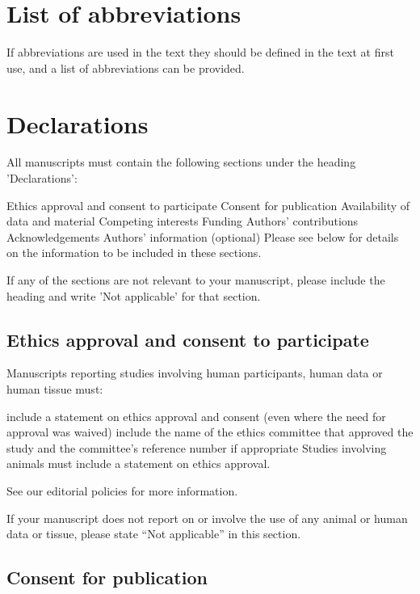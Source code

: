 \documentclass{bmcart}
\begin{document}
\begin{backmatter}



\section*{List of abbreviations}

If abbreviations are used in the text they should be defined in the text at first use, and a list of abbreviations can be provided.

\section*{Declarations}

All manuscripts must contain the following sections under the heading 'Declarations':

Ethics approval and consent to participate
Consent for publication
Availability of data and material
Competing interests
Funding
Authors' contributions
Acknowledgements
Authors' information (optional)
Please see below for details on the information to be included in these sections.

If any of the sections are not relevant to your manuscript, please include the heading and write 'Not applicable' for that section. 

\subsection*{Ethics approval and consent to participate}

Manuscripts reporting studies involving human participants, human data or human tissue must:

include a statement on ethics approval and consent (even where the need for approval was waived)
include the name of the ethics committee that approved the study and the committee’s reference number if appropriate
Studies involving animals must include a statement on ethics approval.

See our editorial policies for more information.

If your manuscript does not report on or involve the use of any animal or human data or tissue, please state “Not applicable” in this section.

\subsection*{Consent for publication}


\end{backmatter}
\end{document}
